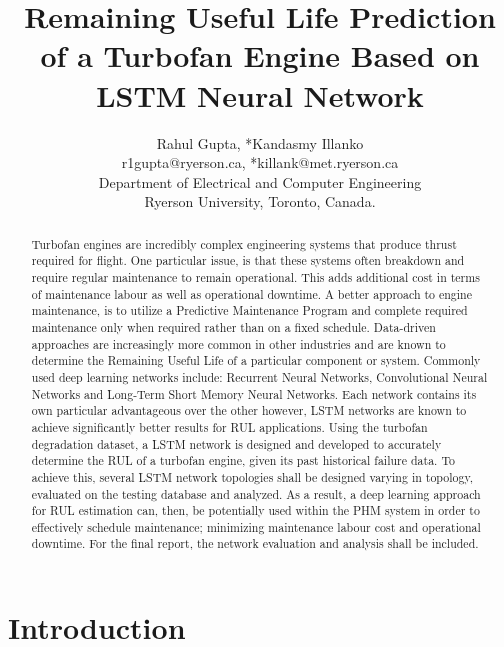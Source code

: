 \documentclass[journal]{IEEEtran}
\begin{document}
\title{Remaining Useful Life Prediction of a Turbofan Engine Based on LSTM Neural Network}

\author{Rahul Gupta, *Kandasmy Illanko\\
r1gupta@ryerson.ca, *killank@met.ryerson.ca\\
Department of Electrical and Computer Engineering\\
Ryerson University, Toronto, Canada.}
\maketitle
\begin{abstract}

Turbofan engines are incredibly complex engineering systems that produce thrust required for flight. One particular issue, is that these systems often breakdown and require regular maintenance to remain operational. This adds additional cost in terms of maintenance labour as well as operational downtime. A better approach to engine maintenance, is to utilize a Predictive Maintenance Program and complete required maintenance only when required rather than on a fixed schedule. Data-driven approaches are increasingly more common in other industries and are known to determine the Remaining Useful Life of a particular component or system. Commonly used deep learning networks include: Recurrent Neural Networks, Convolutional Neural Networks and Long-Term Short Memory Neural Networks. Each network contains its own particular advantageous over the other however, LSTM networks are known to achieve significantly better results for RUL applications. Using the turbofan degradation dataset, a LSTM network is designed and developed to accurately determine the RUL of a turbofan engine, given its past historical failure data. To achieve this, several LSTM network topologies shall be designed varying in topology, evaluated on the testing database and analyzed. As a result, a deep learning approach for RUL estimation can, then, be potentially used within the PHM system in order to effectively schedule maintenance; minimizing maintenance labour cost and operational downtime. For the final report, the network evaluation and analysis shall be included. 


\end{abstract}



\section{Introduction}
\label{intro}
\end{document}
